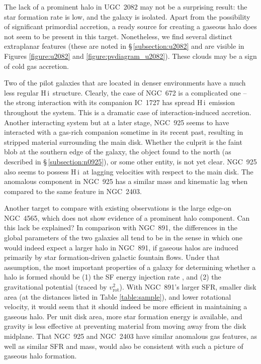\documentclass[oldversion]{aa}
\newcommand{\HI}{{\sc H\,i}}
\begin{document}
The lack of a prominent halo in UGC~2082 may not be a surprising result: the star formation rate is low, and the galaxy is isolated. Apart from the possibility of significant primordial accretion, a ready source for creating a gaseous halo does not seem to be present in this target. Nonetheless, we find several distinct extraplanar features (these are noted in \S\,\ref{subsection:u2082} and are visible in Figures \ref{figure:u2082} and \ref{figure:pvdiagram_u2082}). These clouds may be a sign of cold gas accretion.

Two of the pilot galaxies that are located in denser environments have a much less regular \HI\ structure. Clearly, the case of NGC~672 is a complicated one -- the strong interaction with its companion IC~1727 has spread \HI\ emission throughout the system. This is a dramatic case of interaction-induced accretion. Another interacting system but at a later stage, NGC~925 seems to have interacted with a gas-rich companion sometime in its recent past, resulting in stripped material surrounding the main disk. Whether the culprit is the faint blob at the southern edge of the galaxy, the object found to the north (as described in \S\,\ref{subsection:n0925}), or some other entity, is not yet clear. NGC~925 also seems to possess \HI\ at lagging velocities with respect to the main disk. The anomalous component in NGC~925 has a similar mass and kinematic lag when compared to the same feature in NGC~2403.

Another target to compare with existing observations is the large edge-on NGC~4565, which does not show evidence of a prominent halo component. Can this lack be explained? In comparison with NGC~891, the differences in the global parameters of the two galaxies all tend to be in the sense in which one would indeed expect a larger halo in NGC~891, if gaseous halos are induced primarily by star formation-driven galactic fountain flows. Under that assumption, the most important properties of a galaxy for determining whether a halo is formed should be (1) the SF energy injection rate \citep[per unit disk area; see e.g.][]{dahlem_etal_1995,rossa_dettmar_2003a}, and (2) the gravitational potential (traced by $v_{\mathrm{rot}}^2$). With NGC~891's larger SFR, smaller disk area (at the distances listed in Table \ref{table:sample}), and lower rotational velocity, it would seem that it should indeed be more efficient in maintaining a gaseous halo. Per unit disk area, more star formation energy is available, and gravity is less effective at preventing material from moving away from the disk midplane. That NGC~925 and NGC~2403 have similar anomalous gas features, as well as similar SFR and mass, would also be consistent with such a picture of gaseous halo formation.
\end{document}
